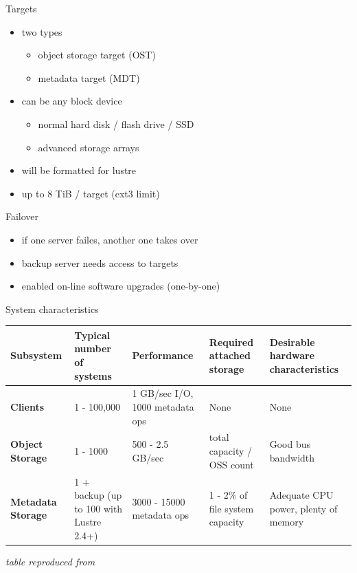 \begin{frame}{Targets}
    \begin{itemize}
        \item two types
            \begin{itemize}
                \item object storage target (OST)
                \item metadata target (MDT)
            \end{itemize}
        \item can be any block device
            \begin{itemize}
                \item normal hard disk / flash drive / SSD
                \item advanced storage arrays
            \end{itemize}
        \item will be formatted for lustre
        \item up to 8 TiB / target (ext3 limit)
    \end{itemize}
\end{frame}

\begin{frame}{Failover}
    \begin{itemize}
        \item if one server failes, another one takes over
        \item backup server needs access to targets
        \item enabled on-line software upgrades (one-by-one)
    \end{itemize}
\end{frame}


\begin{frame}{System characteristics}
    \scriptsize
    \begin{tabularx}{\textwidth}{@{}XXXXX@{}}
        \toprule
        \textbf{Subsystem}
        & Typical number of systems
        & Performance
        & Required attached storage
        & Desirable hardware characteristics\\\midrule
        \textbf{Clients}
        & 1 - 100,000
        & 1 GB/sec I/O, 1000 metadata ops
        & None
        & None \\[30pt]
        \textbf{Object Storage}
        & 1 - 1000
        & 500 - 2.5 GB/sec
        & total capacity / OSS count
        & Good bus bandwidth \\[20pt]
        \textbf{Metadata Storage}
        & 1 + backup (up to 100 with Lustre 2.4+)
        & 3000 - 15000 metadata ops
        & 1 - 2\% of file system capacity
        & Adequate CPU power, plenty of memory \\\bottomrule
    \end{tabularx}

    \vspace{0.3cm}
    \hfill{\scriptsize\emph{table reproduced from \cite{whitepaper}}}
\end{frame}
